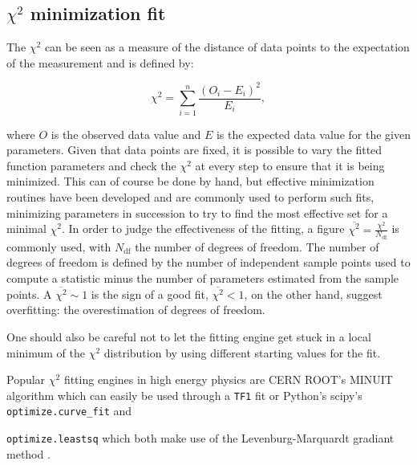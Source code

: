 \subsection{$\chi^2$ minimization fit}

The $\chi^2$ can be seen as a measure of the distance of data points to the expectation of the measurement and is defined by:

\begin{equation}
\chi^2=\sum_{i=1}^{n}\frac{(O_i-E_i)^2}{E_i},
\end{equation}

where $O$ is the observed data value and $E$ is the expected data value for the given parameters. Given that data points are fixed, it is possible to vary the fitted function parameters and check the $\chi^2$ at every step to ensure that it is being minimized. This can of course be done by hand, but effective minimization routines have been developed and are commonly used to perform such fits, minimizing parameters in succession to try to find the most effective set for a minimal $\chi^2$. In order to judge the effectiveness of the fitting, a figure $\overline{\chi^2}=\frac{\chi^2}{N_{\text{df}}}$ is commonly used, with $N_{\text{df}}$ the number of degrees of freedom. The number of degrees of freedom is defined by the number of independent sample points used to compute a statistic minus the number of parameters estimated from the sample points. A $\overline{\chi^2}\sim 1$ is the sign of a good fit, $\overline{\chi^2} < 1$, on the other hand, suggest overfitting: the overestimation of degrees of freedom.


One should also be careful not to let the fitting engine get stuck in a local minimum of the $\chi^2$ distribution by using different starting values for the fit.

Popular $\chi^2$ fitting engines in high energy physics are CERN ROOT's MINUIT algorithm \cite{MINUIT} which can easily be used through a \texttt{TF1} fit or Python's scipy's \texttt{optimize.curve\_fit} and 

\texttt{optimize.leastsq} which both make use of the Levenburg-Marquardt gradiant method \cite{article}.

